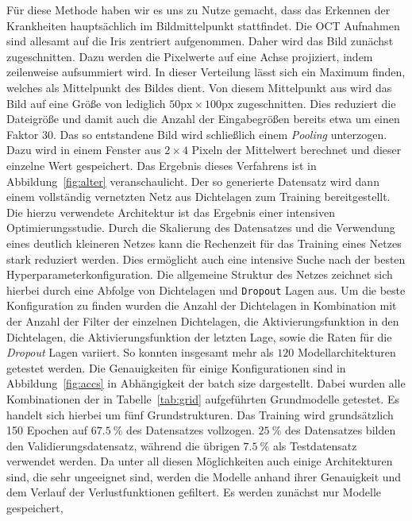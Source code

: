 %
Für diese Methode haben wir es uns zu Nutze gemacht, dass das Erkennen der
Krankheiten hauptsächlich im Bildmittelpunkt stattfindet. Die OCT Aufnahmen
sind allesamt auf die Iris zentriert aufgenommen.
Daher wird das Bild zunächst zugeschnitten. Dazu werden die Pixelwerte auf eine
Achse projiziert, indem zeilenweise aufsummiert wird. In dieser Verteilung
lässt sich ein Maximum finden, welches als Mittelpunkt des Bildes dient.
Von diesem Mittelpunkt aus wird das Bild auf eine Größe von lediglich
$50\text{px}\times100\text{px}$ zugeschnitten. Dies reduziert die Dateigröße
und damit auch die Anzahl der Eingabegrößen bereits etwa um einen
Faktor $30$.
Das so entstandene Bild wird schließlich einem \textit{Pooling} unterzogen.
Dazu wird in einem Fenster aus $2\times4$ Pixeln der Mittelwert berechnet und
dieser einzelne Wert gespeichert. Das Ergebnis dieses Verfahrens ist in
Abbildung~\ref{fig:alter} veranschaulicht.
Der so generierte Datensatz wird dann einem vollständig vernetzten Netz aus
Dichtelagen zum Training bereitgestellt. \\
Die hierzu verwendete Architektur ist das Ergebnis einer intensiven
Optimierungsstudie. Durch die Skalierung des Datensatzes und die Verwendung
eines deutlich kleineren Netzes kann die Rechenzeit für das Training eines
Netzes stark reduziert werden. Dies ermöglicht auch eine intensive Suche nach
der besten Hyperparameterkonfiguration. Die allgemeine Struktur des Netzes
zeichnet sich hierbei durch eine Abfolge von Dichtelagen und \texttt{Dropout}
Lagen aus. Um die beste Konfiguration zu finden wurden die Anzahl der
Dichtelagen in Kombination mit der Anzahl der Filter der einzelnen Dichtelagen,
die Aktivierungsfunktion in den Dichtelagen, die Aktivierungsfunktion der
letzten Lage, sowie die Raten für die \textit{Dropout} Lagen variiert. So
konnten insgesamt mehr als $120$ Modellarchitekturen getestet werden. Die
Genauigkeiten für einige Konfigurationen sind in Abbildung~\ref{fig:accs} in
Abhängigkeit der batch size dargestellt.
Dabei wurden alle Kombinationen der in Tabelle~\ref{tab:grid} aufgeführten
Grundmodelle getestet. Es handelt sich hierbei um fünf Grundstrukturen.
Das Training wird grundsätzlich 150 Epochen auf $\SI{67.5}{\percent}$ des
Datensatzes vollzogen. $\SI{25}{\percent}$ des Datensatzes bilden den
Validierungsdatensatz, während die übrigen $\SI{7.5}{\percent}$ als
Testdatensatz verwendet werden.
Da unter all diesen Möglichkeiten auch einige Architekturen sind, die sehr
ungeeignet sind, werden die Modelle anhand ihrer Genauigkeit und dem Verlauf
der Verlustfunktionen gefiltert. Es werden zunächst nur Modelle gespeichert,

